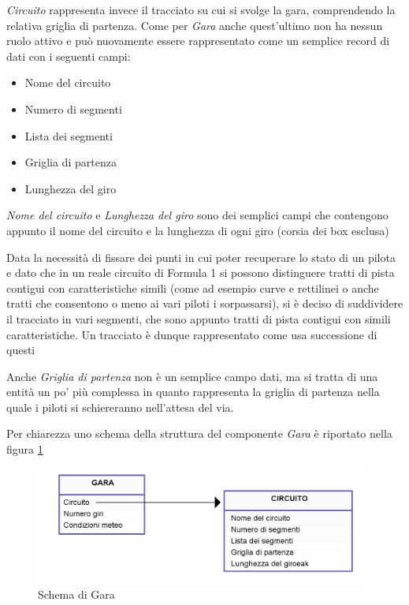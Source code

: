 \documentclass[a4paper,11pt, twoside]{book}
\begin{document}
      \textsl{Circuito} rappresenta invece il tracciato su cui si svolge la gara, comprendendo la relativa griglia di partenza.
      Come per \textsl{Gara} anche quest'ultimo non ha nessun ruolo attivo e può nuovamente
      essere rappresentato come un semplice record di dati con i seguenti campi:      
      
      \begin{itemize}
	\item Nome del circuito
	\item Numero di segmenti
	\item Lista dei segmenti
	\item Griglia di partenza
	\item Lunghezza del giro
      \end{itemize}
      
      \textsl{Nome del circuito} e \textsl{Lunghezza del giro} sono dei semplici campi che contengono appunto
      il nome del circuito e la lunghezza di ogni giro (corsia dei box esclusa)
      
      Data la necessità di fissare dei punti
      in cui poter recuperare lo stato di un pilota e dato che in un reale circuito 
      di Formula 1 si possono distinguere tratti di pista contigui con caratteristiche simili
      (come ad esempio curve e rettilinei o anche
      tratti che consentono o meno ai vari piloti i sorpassarsi), si è deciso
      di suddividere il tracciato in vari segmenti, che sono appunto tratti di pista contigui con simili caratteristiche.
      Un tracciato è dunque rappresentato come usa successione di questi
      
      Anche \textsl{Griglia di partenza} non è un semplice campo dati, ma si tratta di una entità un po' più complessa
      in quanto rappresenta la griglia di partenza nella quale i piloti si schiereranno nell'attesa del via.
      
      Per chiarezza uno schema della struttura del componente \textsl{Gara} è riportato nella figura \ref{Fig:SchemaGara}
      
      \begin{figure}[h]
	\centering
	\includegraphics[width=110mm]{./Immagini/SchemaGara.png}
	\caption{Schema di Gara}
	\label{Fig:SchemaGara}
      \end{figure}
      
\end{document}
